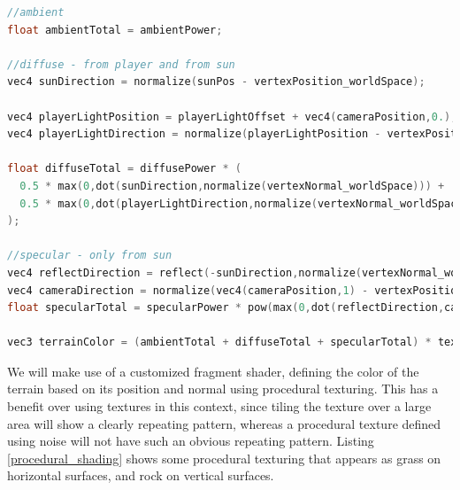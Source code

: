 \documentclass{article}
\begin{document}
\begin{lstlisting}[language=C++,label={lighting},caption={Part of the fragment shader used to determine the light intensity for a given pixel.}]
//ambient
float ambientTotal = ambientPower;

//diffuse - from player and from sun
vec4 sunDirection = normalize(sunPos - vertexPosition_worldSpace);

vec4 playerLightPosition = playerLightOffset + vec4(cameraPosition,0.);
vec4 playerLightDirection = normalize(playerLightPosition - vertexPosition_worldSpace);

float diffuseTotal = diffusePower * (
  0.5 * max(0,dot(sunDirection,normalize(vertexNormal_worldSpace))) +
  0.5 * max(0,dot(playerLightDirection,normalize(vertexNormal_worldSpace)))
);

//specular - only from sun
vec4 reflectDirection = reflect(-sunDirection,normalize(vertexNormal_worldSpace));
vec4 cameraDirection = normalize(vec4(cameraPosition,1) - vertexPosition_worldSpace);
float specularTotal = specularPower * pow(max(0,dot(reflectDirection,cameraDirection)),specularExponent);

vec3 terrainColor = (ambientTotal + diffuseTotal + specularTotal) * textureColor;
\end{lstlisting}
We will make use of a customized fragment shader, defining the color of the terrain based on its position and normal using procedural texturing. This has a benefit over using textures in this context, since tiling the texture over a large area will show a clearly repeating pattern, whereas a procedural texture defined using noise will not have such an obvious repeating pattern. Listing \ref{procedural_shading} shows some procedural texturing that appears as grass on horizontal surfaces, and rock on vertical surfaces.
\end{document}
